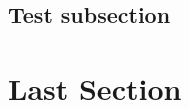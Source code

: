 \documentclass[a4paper,openany]{book}
\begin{document}
{\begin{multicols}{2}
\subsection{Test subsection}

\lipsum[2]

\elf


\lipsum[10]

\section{Last Section}

\lipsum[3]

\end{multicols}

}

\tableofcontents



\end{document}
